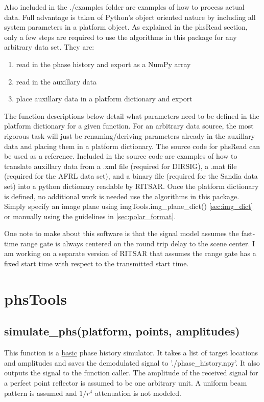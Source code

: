 \documentclass{article}
\begin{document}
Also included in the ./examples folder are examples of how to process actual data.  Full advantage is taken of Python's object oriented nature by including all system parameters in a platform object.  As explained in the phsRead section, only a few steps are required to use the algorithms in this package for any arbitrary data set.  They are:
\begin{enumerate}
\item read in the phase history and export as a NumPy array
\item read in the auxillary data
\item place auxillary data in a platform dictionary and export
\end{enumerate}
The function descriptions below detail what parameters need to be defined in the platform dictionary for a given function.  For an arbitrary data source, the most rigorous task will just be renaming/deriving parameters already in the auxillary data and placing them in a platform dictionary.  The source code for phsRead can be used as a reference.  Included in the source code are examples of how to translate auxillary data from a .xml file (required for DIRSIG), a .mat file (required for the AFRL data set), and a binary file (required for the Sandia data set) into a python dictionary readable by RITSAR.  Once the platform dictionary is defined, no additional work is needed use the algorithms in this package.  Simply specify an image plane using imgTools.img\_plane\_dict() \ref{sec:img_dict} or manually using the guidelines in \ref{sec:polar_format}.

One note to make about this software is that the signal model assumes the fast-time range gate is always centered on the round trip delay to the scene center.  I am working on a separate version of RITSAR that assumes the range gate has a fixed start time with respect to the transmitted start time.

\newpage


\section{phsTools}


\subsection{simulate\_phs(platform, points, amplitudes)}
\label{simulate_phs}
This function is a \underline{basic} phase history simulator.  It takes a list of target locations and amplitudes and saves the demodulated signal to './phase\_history.npy'.  It also outputs the signal to the function caller.  The amplitude of the received signal for a perfect point reflector is assumed to be one arbitrary unit.  A uniform beam pattern is assumed and $1/r^4$ attenuation is not modeled.\\
\end{document}
